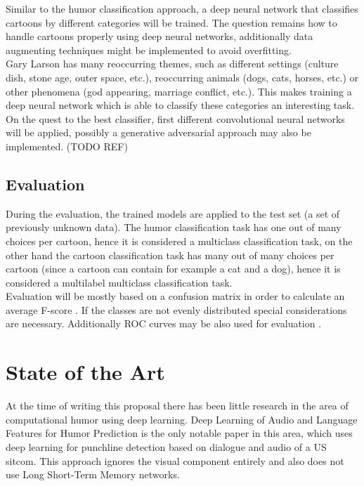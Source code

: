 \documentclass[draft,final,oneside]{vutinfth} %
\begin{document}
Similar to the humor classification approach, a deep neural network that classifies cartoons by different categories will be trained. The question remains how to handle cartoons properly using deep neural networks, additionally data augmenting techniques might be implemented to avoid overfitting. \\

Gary Larson has many reoccurring themes, such as different settings (culture dish, stone age, outer space, etc.), reoccurring animals (dogs, cats, horses, etc.) or other phenomena (god appearing, marriage conflict, etc.). This makes training a deep neural network which is able to classify these categories an interesting task. On the quest to the best classifier, first different convolutional neural networks will be applied, possibly a generative adversarial approach may also be implemented. (TODO REF)

\section {Evaluation}

During the evaluation, the trained models are applied to the test set (a set of previously unknown data). The humor classification task has one out of many choices per cartoon, hence it is considered a multiclass classification task, on the other hand the cartoon classification task has many out of many choices per cartoon (since a cartoon can contain for example a cat and a dog), hence it is considered a multilabel multiclass classification task. \\

Evaluation will be mostly based on a confusion matrix in order to calculate an average F-score \cite{Powers2008EvaluationFP}. If the classes are not evenly distributed special considerations are necessary. Additionally ROC curves may be also used for evaluation \cite{Hand2001}. 

\chapter{State of the Art}

At the time of writing this proposal there has been little research in the area of computational humor using deep learning. Deep Learning of Audio and Language Features for Humor Prediction \cite{Bertero2016DeepLO} is the only notable paper in this area, which uses deep learning for punchline detection based on dialogue and audio of a US sitcom. This approach ignores the visual component entirely and also does not use Long Short-Term Memory networks. \\
\end{document}
